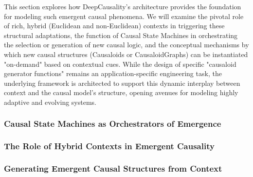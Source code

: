 This section explores how DeepCausality's architecture provides the foundation for modeling such emergent causal phenomena. We will examine the pivotal role of rich, hybrid (Euclidean and non-Euclidean) contexts in triggering these structural adaptations, the function of Causal State Machines in orchestrating the selection or generation of new causal logic, and the conceptual mechanisms by which new causal structures (Causaloids or CausaloidGraphs) can be instantiated "on-demand" based on contextual cues. While the design of specific "causaloid generator functions" remains an application-specific engineering task, the underlying framework is architected to support this dynamic interplay between context and the causal model's structure, opening avenues for modeling highly adaptive and evolving systems.

\subsubsection{Causal State Machines as Orchestrators of Emergence}
\label{subsubsec:emergent_csm}

\subsubsection{The Role of Hybrid Contexts in Emergent Causality}
\label{subsubsec:emergent_hybrid_context}

\subsubsection{Generating Emergent Causal Structures from Context}
\label{subsubsec:emergent_generating_from_context}

